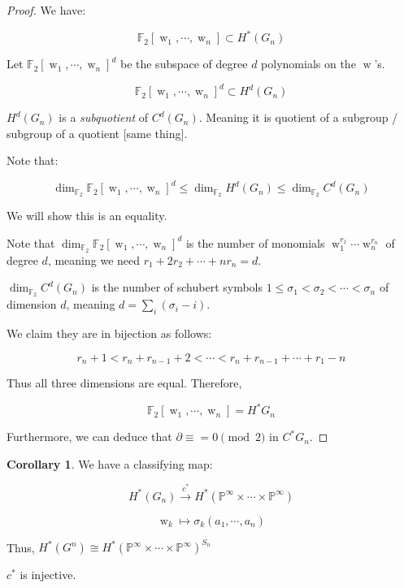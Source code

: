 \documentclass{article}
\theoremstyle{definition}
\newtheorem{corollary}[theorem]{Corollary}
\begin{document}
    \begin{proof}
        We have:

        \[
            \mathbb{F}_2[\operatorname{w}_1, \cdots , \operatorname{w}_n] \subset H^{\ast} (G_n)
        \]

        Let \(\mathbb{F}_2[\operatorname{w}_1, \cdots , \operatorname{w}_n]^d\) be the subspace of degree \(d\) polynomials on the \(\operatorname{w}\)'s.

        \[
            \mathbb{F}_2[\operatorname{w}_1, \cdots , \operatorname{w}_n]^d \subset H^d(G_n)
        \]

        \(H^d(G_n)\) is a \textit{subquotient} of \(C^d(G_n)\). Meaning it is quotient of a subgroup / subgroup of a quotient [same thing].

        Note that:

        \[
            \dim_{\mathbb{F}_2} \mathbb{F}_2[\operatorname{w}_1, \cdots , \operatorname{w}_n]^d \leq \dim_{\mathbb{F}_2} H^d(G_n) \leq \dim_{\mathbb{F}_2} C^d(G_n)
        \]

        We will show this is an equality.

        Note that \(\dim_{\mathbb{F}_2} \mathbb{F}_2[\operatorname{w}_1, \cdots , \operatorname{w}_n]^d\) is the number of monomials \(\operatorname{w}_1^{r_1} \cdots \operatorname{w}_n^{r_n}\) of degree \(d\), meaning we need \(r_1 + 2r_2 + \cdots + n r_n = d\).

        \(\dim_{\mathbb{F}_2} C^d(G_n)\) is the number of schubert symbols \(1 \leq \sigma_1 < \sigma_2 < \cdots < \sigma_n\) of dimension \(d\), meaning \(d = \sum_i (\sigma_i - i)\).

        We claim they are in bijection as follows:

        \[
            r_n + 1 < r_n + r_{n-1} + 2 < \cdots < r_n + r_{n-1} + \cdots + r_1 - n
        \]

        Thus all three dimensions are equal. Therefore,

        \[
            \mathbb{F}_2 [\operatorname{w}_1, \cdots , \operatorname{w}_n] = H^{\ast} G_n
        \]

        Furthermore, we can deduce that \(\partial \equiv = 0 \pmod 2\) in \(C^{\ast} G_n\).
    \end{proof}

    \begin{corollary}
        We have a classifying map:

        \[
            H^{\ast} (G_n) \xrightarrow{c^{\ast}} H^{\ast} (\mathbb{P}^{\infty} \times \cdots \times \mathbb{P}^{\infty})
        \]

        \[
            \operatorname{w}_k \mapsto \sigma_k(a_1, \cdots , a_n)
        \]

        Thus, \(H^{\ast} (G^n) \cong H^{\ast} (\mathbb{P}^{\infty} \times \cdots \times \mathbb{P}^{\infty})^{S_n}\)

        \(c^{\ast}\) is injective.
    \end{corollary}
\end{document}
